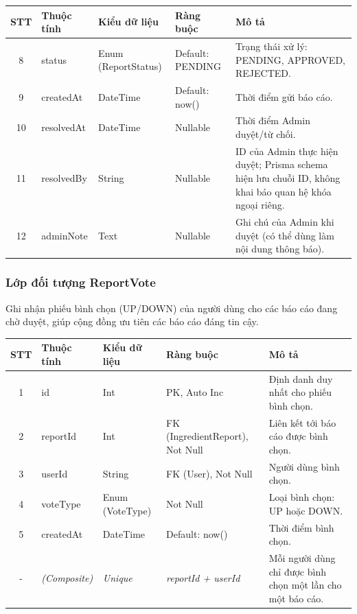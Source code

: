 \documentclass[12pt,a4paper]{article}
\begin{document}
\begin{center}
\renewcommand{\arraystretch}{1.4}
\begin{tabularx}{\textwidth}{|c|l|l|l|X|}
\hline
\rowcolor{blue!15}
\textbf{STT} & \textbf{Thuộc tính} & \textbf{Kiểu dữ liệu} & \textbf{Ràng buộc} & \textbf{Mô tả} \\ \hline
8 & status & Enum (ReportStatus) & Default: PENDING & Trạng thái xử lý: PENDING, APPROVED, REJECTED. \\ \hline
9 & createdAt & DateTime & Default: now() & Thời điểm gửi báo cáo. \\ \hline
10 & resolvedAt & DateTime & Nullable & Thời điểm Admin duyệt/từ chối. \\ \hline
11 & resolvedBy & String & Nullable & ID của Admin thực hiện duyệt; Prisma schema hiện lưu chuỗi ID, không khai báo quan hệ khóa ngoại riêng. \\ \hline
12 & adminNote & Text & Nullable & Ghi chú của Admin khi duyệt (có thể dùng làm nội dung thông báo). \\ \hline
\end{tabularx}
\end{center}

\subsubsection{Lớp đối tượng ReportVote}
Ghi nhận phiếu bình chọn (UP/DOWN) của người dùng cho các báo cáo đang chờ duyệt, giúp cộng đồng ưu tiên các báo cáo đáng tin cậy.

\begin{center}
\renewcommand{\arraystretch}{1.4}
\begin{tabularx}{\textwidth}{|c|l|l|l|X|}
\hline
\rowcolor{blue!15}
\textbf{STT} & \textbf{Thuộc tính} & \textbf{Kiểu dữ liệu} & \textbf{Ràng buộc} & \textbf{Mô tả} \\ \hline
1 & id & Int & PK, Auto Inc & Định danh duy nhất cho phiếu bình chọn. \\ \hline
2 & reportId & Int & FK (IngredientReport), Not Null & Liên kết tới báo cáo được bình chọn. \\ \hline
3 & userId & String & FK (User), Not Null & Người dùng bình chọn. \\ \hline
4 & voteType & Enum (VoteType) & Not Null & Loại bình chọn: UP hoặc DOWN. \\ \hline
5 & createdAt & DateTime & Default: now() & Thời điểm bình chọn. \\ \hline
- & \textit{(Composite)} & \textit{Unique} & \textit{reportId + userId} & Mỗi người dùng chỉ được bình chọn một lần cho một báo cáo. \\ \hline
\end{tabularx}
\end{center}
\end{document}
